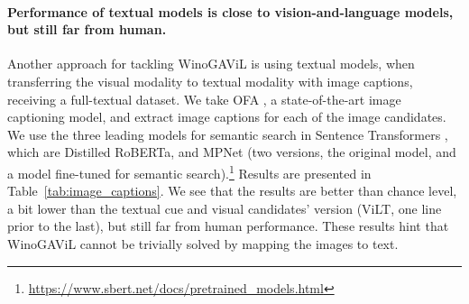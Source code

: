 \documentclass{article}
\newcommand{\ouracronym}[0]{WinoGAViL}
\begin{document}
\paragraph{Performance of textual models is close to vision-and-language models, but still far from human.} Another approach for tackling \ouracronym{} is using textual models, when transferring the visual modality to textual modality with image captions, receiving a full-textual dataset. We take OFA \cite{wang2022unifying}, a state-of-the-art image captioning model, and extract image captions for each of the image candidates. We use the three leading models for semantic search in Sentence Transformers \cite{reimers-2019-sentence-bert}, which are Distilled RoBERTa, \cite{Sanh2019DistilBERTAD} and MPNet \cite{song2020mpnet} (two versions, the original model, and a model fine-tuned for semantic search).\footnote{\url{https://www.sbert.net/docs/pretrained_models.html}} Results are presented in Table~\ref{tab:image_captions}. We see that the results are better than chance level, a bit lower than the textual cue and visual candidates' version (ViLT, one line prior to the last), but still far from human performance. These results hint that \ouracronym{} cannot be trivially solved by mapping the images to text.
\end{document}
